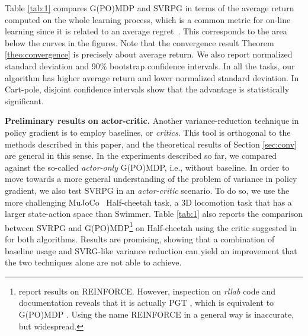 \documentclass{article}
\makeatletter
\theoremstyle{remark}
\theoremstyle{definition}
\DeclareRobustCommand{\eg}{e.g.,\@\xspace}
\DeclareRobustCommand{\ie}{i.e.,\@\xspace}
\makeatother
\begin{document}
Table \ref{tab:1} compares G(PO)MDP and SVRPG in terms of the average return computed on the whole learning process, which is a common metric for on-line learning since it is related to an average regret~\citep[\eg][]{duan2016benchmarking}. This corresponds to the area below the curves in the figures. Note that the convergence result Theorem \ref{theo:convergence} is precisely about average return. We also report normalized standard deviation and 90\% bootstrap confidence intervals.
In all the tasks, our algorithm has higher average return and lower normalized standard deviation.
In Cart-pole, disjoint confidence intervals show that the advantage is statistically significant. 

\textbf{Preliminary results on actor-critic.} %
Another variance-reduction technique in policy gradient is to employ baselines, or \textit{critics}. This tool is orthogonal to the methods described in this paper, and the theoretical results of Section \ref{sec:conv} are general in this sense. In the experiments described so far, we compared against the so-called \textit{actor-only} G(PO)MDP, \ie without baseline. In order to move towards a more general understanding of the problem of variance in policy gradient, we also test SVRPG in an \textit{actor-critic} scenario. To do so, we use the more challenging MuJoCo~\citep{todorov2012mujoco} Half-cheetah task, a 3D locomotion task that has a larger state-action space than Swimmer. Table \ref{tab:1} also reports the comparison between SVRPG and G(PO)MDP\footnote{\cite{duan2016benchmarking} report results on REINFORCE. However, inspection on \textit{rllab} code and documentation reveals that it is actually PGT \cite{sutton2000policy}, which is equivalent to G(PO)MDP \citep[shown by][]{peters2008reinforcement}. Using the name REINFORCE in a general way is inaccurate, but widespread.} on Half-cheetah using the critic suggested in \cite{duan2016benchmarking} for both algorithms. Results are promising, showing that a combination of baseline usage and SVRG-like variance reduction can yield an improvement that the two techniques alone are not able to achieve.
\end{document}
